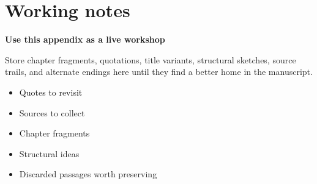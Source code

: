\documentclass[11pt,openany]{book}
\begin{document}
\appendix

\chapter{Working notes}

\begin{notebox}
\textbf{Use this appendix as a live workshop}\par
Store chapter fragments, quotations, title variants, structural sketches, source trails, and alternate endings here until they find a better home in the manuscript.
\end{notebox}

\begin{itemize}
  \item Quotes to revisit
  \item Sources to collect
  \item Chapter fragments
  \item Structural ideas
  \item Discarded passages worth preserving
\end{itemize}
\end{document}
